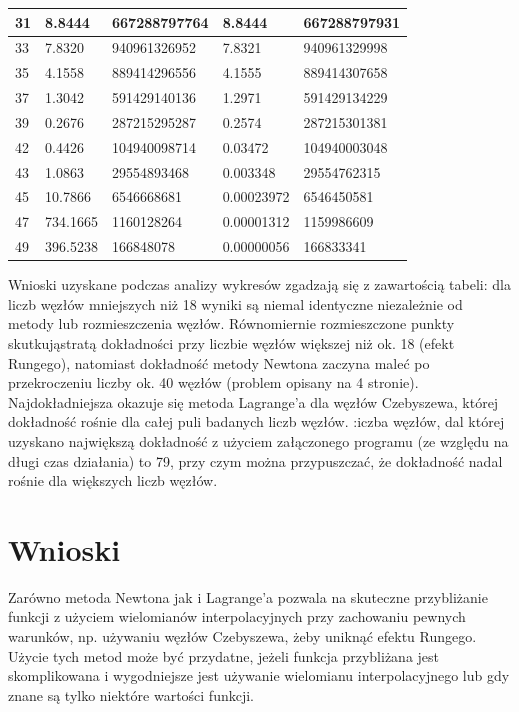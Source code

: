 \documentclass{article}
\begin{document}
\begin{table}[H]
\begin{tabular}{|l|ll|ll|}
    31& \multicolumn{1}{l|}{8.8444}  & 667288797764  & \multicolumn{1}{l|}{8.8444}  & 667288797931  \\ \hline
    33& \multicolumn{1}{l|}{7.8320}  & 940961326952 & \multicolumn{1}{l|}{7.8321}  &  940961329998 \\ \hline
    35& \multicolumn{1}{l|}{4.1558}  &  889414296556 & \multicolumn{1}{l|}{4.1555}  &  889414307658 \\ \hline
    37& \multicolumn{1}{l|}{1.3042}  & 591429140136  & \multicolumn{1}{l|}{1.2971}  &  591429134229 \\ \hline
    39& \multicolumn{1}{l|}{0.2676}  &  287215295287 & \multicolumn{1}{l|}{0.2574}  &  287215301381 \\ \hline
    42& \multicolumn{1}{l|}{0.4426}  & 104940098714  & \multicolumn{1}{l|}{0.03472}  &  104940003048 \\ \hline
    43& \multicolumn{1}{l|}{1.0863}  &  29554893468 & \multicolumn{1}{l|}{0.003348}  & 29554762315  \\ \hline
    45& \multicolumn{1}{l|}{10.7866}  & 6546668681  & \multicolumn{1}{l|}{0.00023972}  &  6546450581 \\ \hline
    47& \multicolumn{1}{l|}{734.1665}  & 1160128264  & \multicolumn{1}{l|}{0.00001312}  &  1159986609 \\ \hline
    49& \multicolumn{1}{l|}{396.5238}  & 166848078  & \multicolumn{1}{l|}{0.00000056}  &  166833341 \\ \hline
    \end{tabular}
\end{table}

Wnioski uzyskane podczas analizy wykresów zgadzają się z zawartością tabeli: dla liczb węzłów mniejszych niż 18 wyniki są niemal identyczne
niezależnie od metody lub rozmieszczenia węzłów. Równomiernie rozmieszczone punkty skutkująstratą dokładności przy liczbie 
węzłów większej niż ok. 18 (efekt Rungego), natomiast dokładność metody Newtona zaczyna maleć
po przekroczeniu liczby ok. 40 węzłów (problem opisany na 4 stronie). Najdokładniejsza okazuje się metoda Lagrange'a dla węzłów
Czebyszewa, której dokładność rośnie dla całej puli badanych liczb węzłów. :iczba węzłów, dal której uzyskano największą
dokładność z użyciem załączonego programu (ze względu na długi czas działania) to 79, przy czym można przypuszczać, że dokładność nadal rośnie dla większych liczb węzłów.

\newpage
\section{Wnioski}
Zarówno metoda Newtona jak i Lagrange'a pozwala na skuteczne przybliżanie funkcji z użyciem wielomianów interpolacyjnych przy zachowaniu 
pewnych warunków, np. używaniu węzłów Czebyszewa, żeby uniknąć efektu Rungego. Użycie tych metod może być przydatne, jeżeli funkcja przybliżana
jest skomplikowana i wygodniejsze jest używanie wielomianu interpolacyjnego lub gdy znane są tylko niektóre wartości funkcji.
\end{document}
